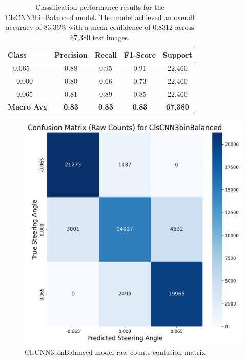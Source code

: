 \begin{table}[htbp]
\centering
\begin{tabular}{@{}lcccc@{}}
\toprule
\textbf{Class} & \textbf{Precision} & \textbf{Recall} & \textbf{F1-Score} & \textbf{Support} \\
\midrule
$-0.065$ & 0.88 & 0.95 & 0.91 & 22,460 \\
$\phantom{-}0.000$ & 0.80 & 0.66 & 0.73 & 22,460 \\
$\phantom{-}0.065$ & 0.81 & 0.89 & 0.85 & 22,460 \\
\midrule
\textbf{Macro Avg} & \textbf{0.83} & \textbf{0.83} & \textbf{0.83} & \textbf{67,380} \\
\bottomrule
\end{tabular}
\caption{Classification performance results for the ClsCNN3binBalanced model. The model achieved an overall accuracy of 83.36\% with a mean confidence of 0.8312 across 67,380 test images.}
\label{tab:clf_report_ClsCNN3binBalanced}
\end{table}


\begin{figure}[H]
\centering
\includegraphics[width=0.65\linewidth]{Figures/Results/cm_raw_ClsCNN3binBalanced.png}
\caption{ClsCNN3binBalanced model raw counts confusion matrix}
\label{fig:cm_raw_ClsCNN3binBalanced}
\end{figure}



